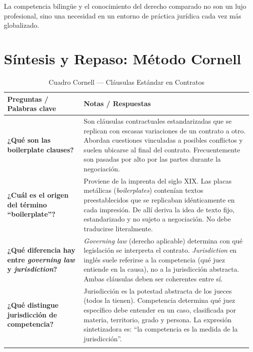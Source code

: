 \documentclass[12pt,oneside]{book}
\begin{document}
La competencia bilingüe y el conocimiento del derecho comparado no son un
lujo profesional, sino una necesidad en un entorno de práctica jurídica
cada vez más globalizado.

\chapter{Síntesis y Repaso: Método Cornell}

\begin{table}[H]
\centering
\caption{Cuadro Cornell — Cláusulas Estándar en Contratos}
\begin{tabularx}{\textwidth}{
    >{\raggedright\arraybackslash}p{}
    >{\raggedright\arraybackslash}X
}
\toprule
\textbf{Preguntas / Palabras clave} & \textbf{Notas / Respuestas} \\
\midrule

\textbf{¿Qué son las boilerplate clauses?} &
Son cláusulas contractuales estandarizadas que se replican con escasas
variaciones de un contrato a otro. Abordan cuestiones vinculadas a posibles
conflictos y suelen ubicarse al final del contrato. Frecuentemente son
pasadas por alto por las partes durante la negociación. \\
\addlinespace

\textbf{¿Cuál es el origen del término ``boilerplate''?} &
Proviene de la imprenta del siglo XIX. Las placas metálicas
(\textit{boilerplates}) contenían textos preestablecidos que se replicaban
idénticamente en cada impresión. De allí deriva la idea de texto fijo,
estandarizado y no sujeto a negociación. No debe traducirse literalmente. \\
\addlinespace

\textbf{¿Qué diferencia hay entre \textit{governing law} y \textit{jurisdiction}?} &
\textit{Governing law} (derecho aplicable) determina con qué legislación se
interpreta el contrato. \textit{Jurisdiction} en inglés suele referirse a la
competencia (qué juez entiende en la causa), no a la jurisdicción abstracta.
Ambas cláusulas deben ser coherentes entre sí. \\
\addlinespace

\textbf{¿Qué distingue jurisdicción de competencia?} &
Jurisdicción es la potestad abstracta de los jueces (todos la tienen).
Competencia determina qué juez específico debe entender en un caso,
clasificada por materia, territorio, grado y persona. La expresión
sintetizadora es: ``la competencia es la medida de la jurisdicción''. \\
\addlinespace


\end{tabularx}
\end{table}
\end{document}
